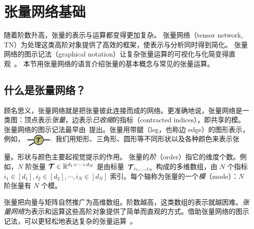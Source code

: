 \section{张量网络基础}\label{chapter:basics}

随着阶数升高，张量的表示与运算都变得更加复杂。
张量网络（tensor network, TN）为处理这类高阶对象提供了高效的框架，使表示与分析同时得到简化。
张量网络的图示记法（graphical notation）让复杂张量运算的可视化与化简变得直观~\citep{orus2014practical,biamonte2017tensor}。
本节用张量网络的语言介绍张量的基本概念与常见的张量运算。

\subsection{什么是张量网络？}
顾名思义，张量网络就是把张量彼此连接而成的网络。更准确地说，张量网络是一类图：顶点表示\emph{张量}，边表示\emph{已收缩}的指标（contracted indices），即共享的模。张量网络的图示记法最早由~\cite{penrose1971applications}提出。张量用带腿（leg，也称边 edge）的图形表示，例如，
$
\begin{tikzpicture}[baseline=-0.5ex]
    \tikzset{tensor/.style = {minimum size = 0.5cm,shape = circle,thick,draw=black,inner sep = 0pt}, edge/.style = {thick,line width=.4mm},every loop/.style={}}
    \def\x{6}
    \node[tensor,fill=green!50!red!50!white] (T) at (\x,0) {$\Tt$};
    \draw[edge] (T) -- (\x-0.6,0);
    \draw[edge] (T) -- (\x+0.6,0);
    \draw[edge] (T) -- (\x-0.5,-0.3);
    \draw[dotted] (T) -- (\x,-0.6);
    \draw[dotted] (T) -- (\x+0.5,-0.3);
    \draw[dotted] (T) -- (\x+0.3,-0.5);
    \end{tikzpicture}.
$
我们用矩形、三角形、圆形等不同形状以及各种颜色来表示张量。形状与颜色主要起视觉提示的作用。
张量的\emph{阶}（order）指它的维度个数。例如，$N$ 阶张量 $\bm{\mathcal{T}}\in\mathbb{R}^{d_1\times\cdots\times d_N}$ 是由标量~$\bm{\mathcal{T}}_{i_1,\dots,i_N}$ 构成的多维数组，由 $N$ 个指标 $i_1\in [d_1], i_2\in[d_2],\cdots, i_N \in [d_N]$ 索引。每个轴称为张量的一个\emph{模}（mode）：$N$ 阶张量有 $N$ 个模。
 
 张量把向量与矩阵自然推广为高维数组。阶数越高，这类数组的表示就越困难。\emph{张量网络}为表示和运算这些高阶对象提供了简单而直观的方式。借助张量网络的图示记法，可以更轻松地表达复杂的张量运算~\citep{biamonte2017tensor,orus2014practical}。


